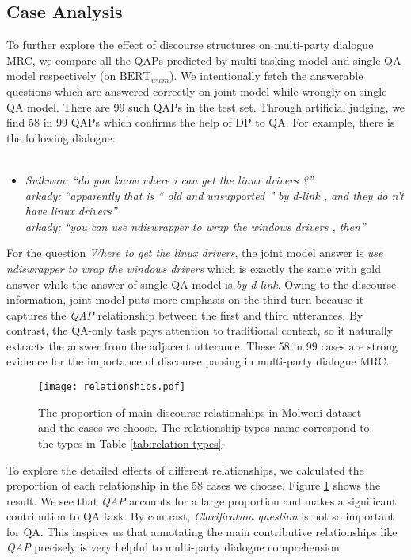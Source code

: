 \documentclass[11pt]{article}
\begin{document}
\subsection{Case Analysis}\label{subsubsec:case analysis} 
To further explore the effect of discourse structures on multi-party dialogue MRC, we compare all the QAPs predicted by multi-tasking model and single QA model respectively (on $\textrm{BERT}_{wwm}$). We intentionally fetch the answerable questions which are answered correctly on joint model while wrongly on single QA model. There are 99 such QAPs in the test set. Through artificial judging, we find 58 in 99 QAPs 
which confirms the help of DP to QA. For example, there is the following dialogue:
\\  \\
\vspace{-1cm}
\begin{itemize}[leftmargin=0.3cm]
\item[]
	 \textit{Suikwan:}  \textit{``do you know where i can get the linux drivers ?''} \\
	 \textit{arkady:}  \textit{``apparently that is `` old and unsupported '' by d-link , and they do n't have linux drivers''} \\
	 \textit{arkady:}  \textit{``you can use ndiswrapper to wrap the windows drivers , then''}\\
\end{itemize}
\vspace{-0.5cm}

For the question \textit{Where to get the linux drivers}, the joint model answer is 
\textit{use ndiswrapper to wrap the windows drivers} which is exactly the same with gold answer while the answer of single QA model is \textit{by d-link}. Owing to the discourse information, joint model puts more emphasis on the third turn because it captures the \textit{QAP} relationship between the first and third utterances. By contrast, the QA-only task pays attention to traditional context, so it naturally extracts the answer from the adjacent utterance. These 58 in 99 cases are strong evidence for the importance of discourse parsing in multi-party dialogue MRC.

\begin{figure}[ht]
		\centering
		\texttt{[image: relationships.pdf]}
		\caption{\label{fig:relationships proportion}The proportion of main discourse relationships in Molweni dataset and the cases we choose. The relationship types name correspond to the types in Table \ref{tab:relation types}.}
\end{figure}
To explore the detailed effects of different relationships, we calculated the proportion of each relationship in the 58 cases we choose. Figure \ref{fig:relationships proportion} shows the result. We see that \textit{QAP} accounts for a large proportion and makes a significant contribution to QA task. By contrast, \textit{Clarification question} is not so important for QA.
This inspires us that annotating the main contributive relationships like \textit{QAP} precisely is very helpful to multi-party dialogue comprehension.
\end{document}
